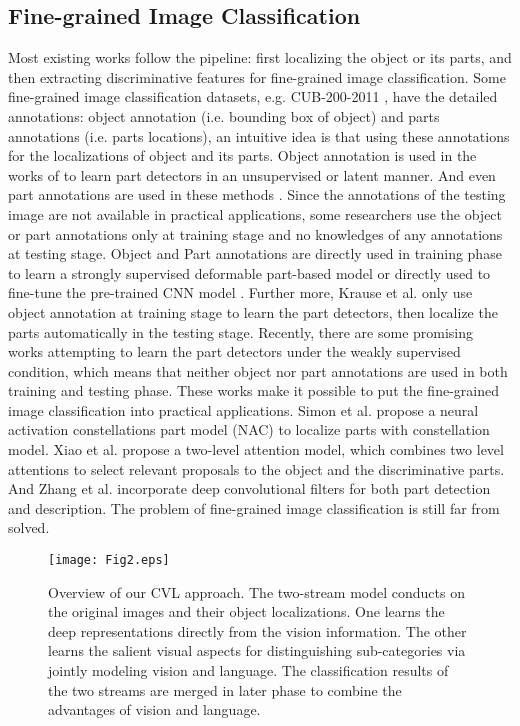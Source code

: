 \documentclass[10pt,twocolumn,letterpaper]{article}
\begin{document}
\subsection{Fine-grained Image Classification}
Most existing works follow the pipeline: first localizing the object or its parts, and then extracting discriminative features for fine-grained image classification. Some fine-grained image classification datasets, e.g. CUB-200-2011 \cite{cub2011}, have the detailed annotations: object annotation (i.e. bounding box of object) and parts annotations (i.e. parts locations), an intuitive idea is that using these annotations for the localizations of object and its parts. Object annotation is used in the works of \cite{chai2013symbiotic,yang2012unsupervised} to learn part detectors in an unsupervised or latent manner. And even part annotations are used in these methods \cite{berg2013poof,xie2013hierarchical}. Since the annotations of the testing image are not available in practical applications, some researchers use the object or part annotations only at training stage and no knowledges of any annotations at testing stage. Object and Part annotations are directly used in training phase to learn a strongly supervised deformable part-based model \cite{zhang2013deformable} or directly used to fine-tune the pre-trained CNN model \cite{branson2014bird}. Further more, Krause et al. \cite{krause2015fine} only use object annotation at training stage to learn the part detectors, then localize the parts automatically in the testing stage. Recently, there are some promising works attempting to learn the part detectors under the weakly supervised condition, which means that neither object nor part annotations are used in both training and testing phase. These works make it possible to put the fine-grained image classification into practical applications. Simon et al. \cite{simon2015neural} propose a neural activation constellations part model (NAC) to localize parts with constellation model. Xiao et al. \cite{twoattention} propose a two-level attention model, which combines two level attentions to select relevant proposals to the object and the discriminative parts. And Zhang et al. \cite{picking} incorporate deep convolutional filters for both part detection and description. The problem of fine-grained image classification is still far from solved. 
\begin{figure*}[!ht]
\begin{center}
\texttt{[image: Fig2.eps]}
\end{center}
   \caption{Overview of our CVL approach. The two-stream model conducts on the original images and their object localizations. One learns the deep representations directly from the vision information. The other learns the salient visual aspects for distinguishing sub-categories via jointly modeling vision and language. The classification results of the two streams are merged in later phase to combine the advantages of vision and language.}
\label{framework}
\end{figure*}
\end{document}
